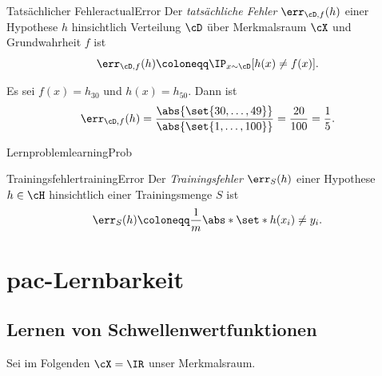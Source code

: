 \documentclass[language=ngerman,algolist,acrolist]{TemplateLecture}
\begin{document}
\begin{defi}{Tatsächlicher Fehler}{actualError}
    Der \emph{tatsächliche Fehler} $\err_{\cD, f}(h)$ einer Hypothese $h$ hinsichtlich Verteilung $\cD$ über Merkmalsraum $\cX$ und Grundwahrheit $f$ ist 
    \begin{equation*}
        \err_{\cD, f}(h) \coloneqq \IP_{x \sim \cD}[h(x) \neq f(x)].
    \end{equation*}
\end{defi}

\begin{expl}
    Es sei $f(x) = h_{30}$ und $h(x) = h_{50}$. Dann ist
    \begin{equation*}
        \err_{\cD, f}(h) = \frac{\abs{\set{30,\ldots,49}}}{\abs{\set{1,\ldots,100}}} = \frac{20}{100} = \frac{1}{5}.
    \end{equation*}
\end{expl}

\begin{prob}{Lernproblem}{learningProb}
\end{prob}
\begin{defi}{Trainingsfehler}{trainingError}
    Der \emph{Trainingsfehler} $\err_S(h)$ einer Hypothese $h \in \cH$ hinsichtlich einer Trainingsmenge $S$ ist 
    \begin{equation*}
        \err_S(h) \coloneqq \frac{1}{m} \abs*{\set*{h(x_i) \neq y_i}}.
    \end{equation*}
\end{defi}



\chapter{\acs{pac}-Lernbarkeit}

\section{Lernen von Schwellenwertfunktionen}

Sei im Folgenden $\cX = \IR$ unser Merkmalsraum.
\end{document}
